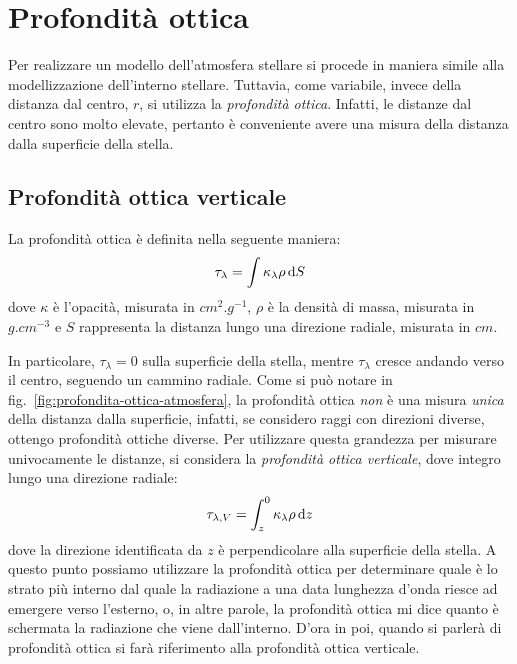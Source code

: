 \section{Profondità ottica}\label{sec:profondità-ottica}
Per realizzare un modello dell'atmosfera stellare si procede in maniera simile alla modellizzazione dell'interno stellare. Tuttavia, come variabile, invece della distanza dal centro, $r$, si utilizza la \emph{profondità ottica}. Infatti, le distanze dal centro sono molto elevate, pertanto è conveniente avere una misura della distanza dalla superficie della stella. 

\subsection{Profondità ottica verticale}
La profondità ottica è definita nella seguente maniera:
\begin{equation}\label{eq:profondità-ottica-atmosfera}
    \tau_\lambda = \int \kappa_\lambda \rho \mathop{}\!\mathrm{d} S
\end{equation}
dove $\kappa$ è l'opacità, misurata in $\si{cm^2.g^{-1}}$, $\rho$ è la densità di massa, misurata in $\si{g.cm^{-3}}$ e $S$ rappresenta la distanza lungo una direzione radiale, misurata in $\si{cm}$.



In particolare, $\tau_\lambda = 0$ sulla superficie della stella, mentre $\tau_\lambda$ cresce andando verso il centro, seguendo un cammino radiale. Come si può notare in fig.~\ref{fig:profondita-ottica-atmosfera}, la profondità ottica \emph{non} è una misura \emph{unica} della distanza dalla superficie, infatti, se considero raggi con direzioni diverse, ottengo profondità ottiche diverse. Per utilizzare questa grandezza per misurare univocamente le distanze, si considera la \emph{profondità ottica verticale}, dove integro lungo una direzione radiale:
\begin{equation}\label{eq:profondità-ottica-verticale}
    \tau_{\lambda, V} = \int_z^0 \kappa_\lambda \rho \mathop{}\!\mathrm{d} z
\end{equation}
dove la direzione identificata da $z$ è perpendicolare alla superficie della stella. A questo punto possiamo utilizzare la profondità ottica per determinare quale è lo strato più interno dal quale la radiazione a una data lunghezza d'onda riesce ad emergere verso l’esterno, o, in altre parole, la profondità ottica mi dice quanto è schermata la radiazione che viene dall'interno. D'ora in poi, quando si parlerà di profondità ottica si farà riferimento alla profondità ottica verticale.

